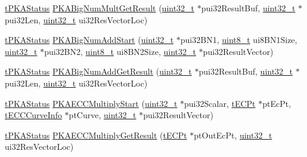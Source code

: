 \begin{DoxyCompactItemize}
\item 
\hyperlink{pka_8h_a94af1eb5fa0257508f865b5e40de4ed3}{t\+P\+K\+A\+Status} \hyperlink{group__pka__driver_ga4891923a934ab7b9e174fdfd014665c6}{P\+K\+A\+Big\+Num\+Mult\+Get\+Result} (\hyperlink{_p_e___types_8h_a33594304e786b158f3fb30289278f5af}{uint32\+\_\+t} $\ast$pui32\+Result\+Buf, \hyperlink{_p_e___types_8h_a33594304e786b158f3fb30289278f5af}{uint32\+\_\+t} $\ast$pui32\+Len, \hyperlink{_p_e___types_8h_a33594304e786b158f3fb30289278f5af}{uint32\+\_\+t} ui32\+Res\+Vector\+Loc)
\item 
\hyperlink{pka_8h_a94af1eb5fa0257508f865b5e40de4ed3}{t\+P\+K\+A\+Status} \hyperlink{group__pka__driver_ga41ae8dff39418d7499db8555a2a4b592}{P\+K\+A\+Big\+Num\+Add\+Start} (\hyperlink{_p_e___types_8h_a33594304e786b158f3fb30289278f5af}{uint32\+\_\+t} $\ast$pui32\+B\+N1, \hyperlink{_p_e___types_8h_aba7bc1797add20fe3efdf37ced1182c5}{uint8\+\_\+t} ui8\+B\+N1\+Size, \hyperlink{_p_e___types_8h_a33594304e786b158f3fb30289278f5af}{uint32\+\_\+t} $\ast$pui32\+B\+N2, \hyperlink{_p_e___types_8h_aba7bc1797add20fe3efdf37ced1182c5}{uint8\+\_\+t} ui8\+B\+N2\+Size, \hyperlink{_p_e___types_8h_a33594304e786b158f3fb30289278f5af}{uint32\+\_\+t} $\ast$pui32\+Result\+Vector)
\item 
\hyperlink{pka_8h_a94af1eb5fa0257508f865b5e40de4ed3}{t\+P\+K\+A\+Status} \hyperlink{group__pka__driver_ga77cf473c12e2c506e6753dacfd3bf219}{P\+K\+A\+Big\+Num\+Add\+Get\+Result} (\hyperlink{_p_e___types_8h_a33594304e786b158f3fb30289278f5af}{uint32\+\_\+t} $\ast$pui32\+Result\+Buf, \hyperlink{_p_e___types_8h_a33594304e786b158f3fb30289278f5af}{uint32\+\_\+t} $\ast$pui32\+Len, \hyperlink{_p_e___types_8h_a33594304e786b158f3fb30289278f5af}{uint32\+\_\+t} ui32\+Res\+Vector\+Loc)
\item 
\hyperlink{pka_8h_a94af1eb5fa0257508f865b5e40de4ed3}{t\+P\+K\+A\+Status} \hyperlink{group__pka__driver_ga99c8ab12e5a5fcba7f63ad0d2f9a98dd}{P\+K\+A\+E\+C\+C\+Multiply\+Start} (\hyperlink{_p_e___types_8h_a33594304e786b158f3fb30289278f5af}{uint32\+\_\+t} $\ast$pui32\+Scalar, \hyperlink{pka_8h_ad8a0d9ffc3dc89cecf35c8fac620a030}{t\+E\+C\+Pt} $\ast$pt\+Ec\+Pt, \hyperlink{ecc__curveinfo_8h_a17a628519ae5ba49f5cf62decade4dcb}{t\+E\+C\+C\+Curve\+Info} $\ast$pt\+Curve, \hyperlink{_p_e___types_8h_a33594304e786b158f3fb30289278f5af}{uint32\+\_\+t} $\ast$pui32\+Result\+Vector)
\item 
\hyperlink{pka_8h_a94af1eb5fa0257508f865b5e40de4ed3}{t\+P\+K\+A\+Status} \hyperlink{group__pka__driver_ga8ed171250f4b3a26e1f8268a41503450}{P\+K\+A\+E\+C\+C\+Multiply\+Get\+Result} (\hyperlink{pka_8h_ad8a0d9ffc3dc89cecf35c8fac620a030}{t\+E\+C\+Pt} $\ast$pt\+Out\+Ec\+Pt, \hyperlink{_p_e___types_8h_a33594304e786b158f3fb30289278f5af}{uint32\+\_\+t} ui32\+Res\+Vector\+Loc)

\end{DoxyCompactItemize}
